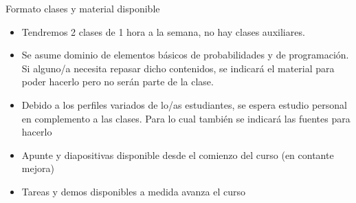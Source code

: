 \documentclass[9pt]{beamer}
\begin{document}
\begin{frame}{Formato clases y material disponible}


\begin{itemize}
  \item Tendremos 2 clases de 1 hora a la semana, no hay clases auxiliares. 
  \item Se asume dominio de elementos básicos de probabilidades y de programación. Si alguno/a necesita repasar dicho contenidos, se indicará el material para poder hacerlo pero no serán parte de la clase. 
  \item Debido a los perfiles variados de lo/as estudiantes, se espera estudio personal en complemento a las clases. Para lo cual también se indicará las fuentes para hacerlo
  \item Apunte y diapositivas disponible desde el comienzo del curso (en contante mejora)
  \item Tareas y demos disponibles a medida avanza el curso
\end{itemize}
\vfill


\end{frame}
\end{document}
